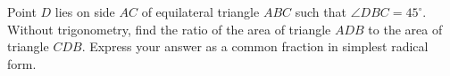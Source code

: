 Point $D$ lies on side $AC$ of equilateral triangle $ABC$ such that $\angle DBC=45^\circ$. Without trigonometry, find the ratio of the area of triangle $ADB$ to the area of triangle $CDB$. Express your answer as a common fraction in simplest radical form.
